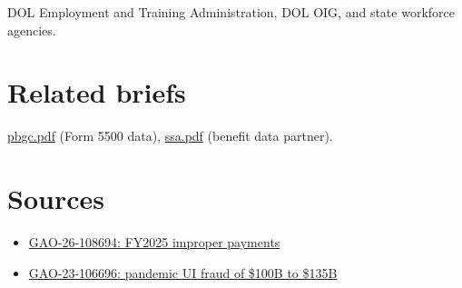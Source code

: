 \documentclass[letterpaper,11pt]{article}
\providecommand{\tightlist}{\setlength{\itemsep}{0pt}\setlength{\parskip}{0pt}}
\begin{document}
DOL Employment and Training Administration, DOL OIG, and state workforce
agencies.

\hypertarget{related-briefs}{%
\section{Related briefs}\label{related-briefs}}

\url{pbgc.pdf} (Form 5500 data), \url{ssa.pdf} (benefit data partner).

\hypertarget{sources}{%
\section{Sources}\label{sources}}

\begin{itemize}
\tightlist
\item
  \href{https://www.gao.gov/products/gao-26-108694}{GAO-26-108694:
  FY2025 improper payments}
\item
  \href{https://www.gao.gov/products/gao-23-106696}{GAO-23-106696:
  pandemic UI fraud of \$100B to \$135B}
\end{itemize}
\end{document}
